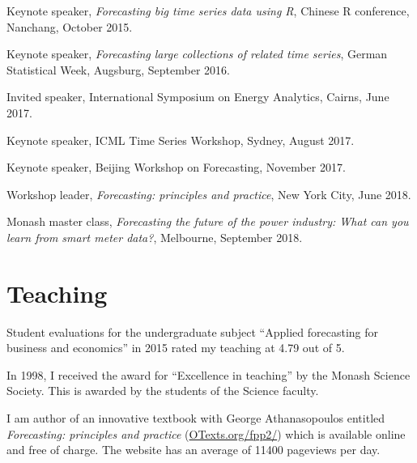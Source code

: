 \documentclass[a4paper,10pt]{article}
\begin{document}
\begin{compactitem}
\item Keynote speaker, \emph{Forecasting big time series data using R}, Chinese R conference, Nanchang, October 2015.
\item Keynote speaker, \emph{Forecasting large collections of related time series}, German Statistical Week, Augsburg, September 2016.
\item Invited speaker, International Symposium on Energy Analytics, Cairns, June 2017.
\item Keynote speaker, ICML Time Series Workshop, Sydney, August 2017.
\item Keynote speaker, Beijing Workshop on Forecasting, November 2017.
\item Workshop leader, \emph{Forecasting: principles and practice}, New York City, June 2018.
\item Monash master class, \emph{Forecasting the future of the power industry: What can you learn from smart meter data?}, Melbourne, September 2018.
\end{compactitem}


\section{Teaching}

\begin{compactitem}\itemsep=0.1cm
\item %
Student evaluations for the undergraduate subject ``Applied forecasting for business and economics'' in 2015 rated my teaching at 4.79 out of 5.

\item In 1998, I received the award for ``Excellence in teaching'' by the Monash Science Society. This is awarded by the students of the Science faculty.
\item I am author of an innovative textbook with George Athanasopoulos entitled \textit{Forecasting: principles and practice} (\url{OTexts.org/fpp2/}) which is available online and free of charge. The website has an average of 11400 pageviews per day.

\end{compactitem}
\end{document}
